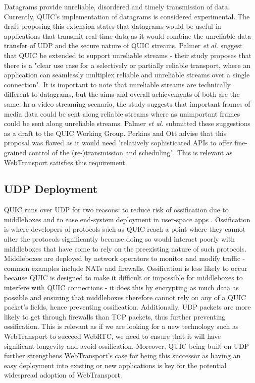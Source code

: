 Datagrams provide unreliable, disordered and timely transmission of data. Currently, QUIC's implementation of datagrams is considered experimental. The draft proposing this extension states that datagrams would be useful in applications that transmit real-time data as it would combine the unreliable data transfer of UDP and the secure nature of QUIC streams. \cite{quic-datagrams-draft} 
Palmer \textit{et al.} suggest that QUIC be extended to support unreliable streams - their study proposes that there is a "clear use case for a selectively or partially reliable transport, where an application can seamlessly multiplex reliable and unreliable streams over a single connection". \cite{palmer2018} It is important to note that unreliable streams are technically different to datagrams, but the aims and overall achievements of both are the same. In a video streaming scenario, the study suggests that important frames of media data could be sent along reliable streams where as unimportant frames could be sent along unreliable streams. Palmer \textit{et al.} submitted these suggestions as a draft to the QUIC Working Group. \cite{palmerdraft}
Perkins and Ott \cite{perkins2018} advise that this proposal was flawed as it would need "relatively sophisticated APIs to offer fine-grained control of the (re-)transmission and scheduling". This is relevant as WebTransport satisfies this requirement.

\subsection{UDP Deployment}

QUIC runs over UDP for two reasons: to reduce risk of ossification due to middleboxes \cite{ossification} and to ease end-system deployment in user-space apps \cite{quic-udp-deployment}. Ossification is where developers of protocols such as QUIC reach a point where they cannot alter the protocols significantly because doing so would interact poorly with middleboxes that have come to rely on the preexisting nature of such protocols. Middleboxes are deployed by network operators to monitor and modify traffic - common examples include NATs and firewalls. Ossification is less likely to occur because QUIC is designed to make it difficult or impossible for middleboxes to interfere with QUIC connections - it does this by encrypting as much data as possible and ensuring that middleboxes therefore cannot rely on any of a QUIC packet's fields, hence preventing ossification. Additionally, UDP packets are more likely to get through firewalls than TCP packets, thus further preventing ossification. This is relevant as if we are looking for a new technology such as WebTransport to succeed WebRTC, we need to ensure that it will have significant longevity and avoid ossification. Moreover, QUIC being built on UDP further strengthens WebTransport's case for being this successor as having an easy deployment into existing or new applications is key for the potential widespread adoption of WebTransport.  

